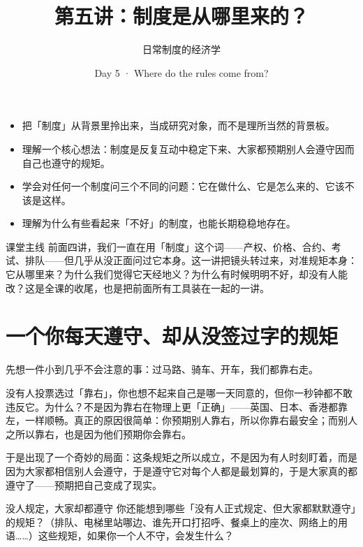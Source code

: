 \documentclass[10pt,a4paper]{ctexart}
\title{\vspace{-2em}\bfseries 第五讲：制度是从哪里来的？}
\author{日常制度的经济学}
\date{Day 5 · Where do the rules come from?}
\begin{document}
\maketitle
\thispagestyle{fancy}

\begin{goalsbox}
\begin{itemize}
  \item 把「制度」从背景里拎出来，当成研究对象，而不是理所当然的背景板。
  \item 理解一个核心想法：制度是反复互动中稳定下来、大家都预期别人会遵守因而自己也遵守的规矩。
  \item 学会对任何一个制度问三个不同的问题：它在做什么、它是怎么来的、它该不该是这样。
  \item 理解为什么有些看起来「不好」的制度，也能长期稳稳地存在。
\end{itemize}
\end{goalsbox}

\begin{keybox}{课堂主线}
前面四讲，我们一直在用「制度」这个词——产权、价格、合约、考试、排队——但几乎从没正面问过它本身。这一讲把镜头转过来，对准规矩本身：它从哪里来？为什么我们觉得它天经地义？为什么有时候明明不好，却没有人能改？这是全课的收尾，也是把前面所有工具装在一起的一讲。
\end{keybox}

\section{一个你每天遵守、却从没签过字的规矩}

先想一件小到几乎不会注意的事：过马路、骑车、开车，我们都靠右走。

没有人投票选过「靠右」，你也想不起来自己是哪一天同意的，但你一秒钟都不敢违反它。为什么？不是因为靠右在物理上更「正确」——英国、日本、香港都靠左，一样顺畅。真正的原因很简单：你预期别人靠右，所以你靠右最安全；而别人之所以靠右，也是因为他们预期你会靠右。

于是出现了一个奇妙的局面：这条规矩之所以成立，不是因为有人时刻盯着，而是因为大家都相信别人会遵守，于是遵守它对每个人都是最划算的，于是大家真的都遵守了——预期把自己变成了现实。

\begin{discussionbox}{没人规定，大家却都遵守}
你还能想到哪些「没有人正式规定、但大家都默默遵守」的规矩？（排队、电梯里站哪边、谁先开口打招呼、餐桌上的座次、网络上的用语……）这些规矩，如果你一个人不守，会发生什么？
\end{discussionbox}
\end{document}

